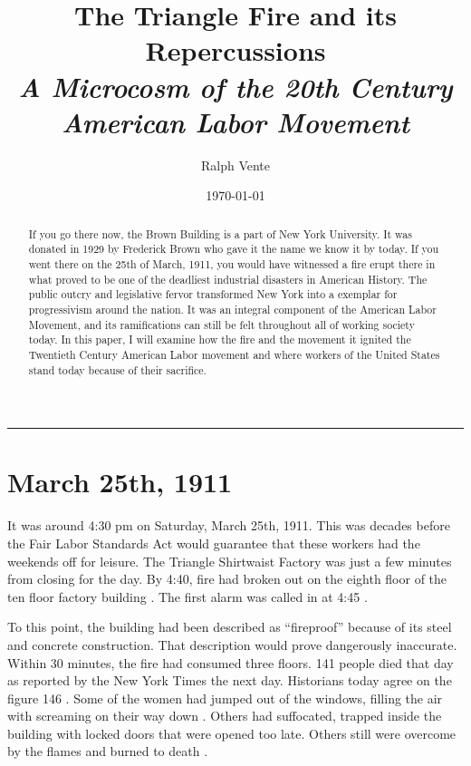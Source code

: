\documentclass[12pt]{article}
\begin{document}
  \title{The Triangle Fire and its Repercussions \\
  {\large \textit {A Microcosm of the 20th Century American Labor Movement}}}
  \author{Ralph Vente}
  \date{\today}

  \begin{titlepage}
    \maketitle
    \hrule
    \thispagestyle{empty}

    \begin{abstract}

      If you go there now, the Brown Building is a part of New York University.
      It was donated in 1929 by Frederick Brown who gave it the name we know it
      by today. If you went there on the 25th of March, 1911, you would have
      witnessed a fire erupt there in what proved to be one of the deadliest
      industrial disasters in American History. The public outcry and
      legislative fervor transformed New York into a exemplar for progressivism
      around the nation. It was an integral component of the American Labor
      Movement, and its ramifications can still be felt throughout all of
      working society today. In this paper, I will examine how the fire and the
      movement it ignited the Twentieth Century American Labor movement and
      where workers of the United States stand today because of their sacrifice.

    \end{abstract}
  \end{titlepage}

\section{March 25th, 1911}

It was around 4:30 pm on Saturday, March 25th, 1911. This was decades before the
Fair Labor Standards Act would guarantee that these workers had the weekends off
for leisure. The Triangle Shirtwaist Factory was just a few minutes from closing
for the day. By 4:40, fire had broken out on the eighth floor of the ten floor
factory building \parencite[628]{Ev1995}. The first alarm was called in at 4:45
\parencite[628]{Ev1995}.

To this point, the building had been described as ``fireproof'' because of its steel
and concrete construction. That description would prove dangerously inaccurate.
Within 30 minutes, the fire had consumed three floors. 141 people died that day
as reported by the New York Times the next day. Historians today agree on the
figure 146 \parencite[622]{Ev1995}. Some of the women had jumped out of the
windows, filling the air with screaming on their way down
\parencite[14]{stein2010triangle}. Others had suffocated, trapped inside the
building with locked doors that were opened too late. Others still were overcome
by the flames and burned to death \parencite{shepherd1911eyewitness}.
\end{document}
